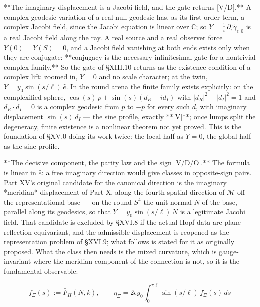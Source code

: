 **The imaginary displacement is a Jacobi field, and the gate returns [V/D].** A complex geodesic variation of a real null geodesic has, as its first-order term, a complex Jacobi field, since the Jacobi equation is linear over $\mathbb C$; so $Y = \tfrac1i\,\partial_\epsilon\widetilde\gamma_\epsilon|_0$ is a real Jacobi field along the ray. A real source and a real observer force $Y(0) = Y(S) = 0$, and a Jacobi field vanishing at both ends exists only when they are conjugate: **conjugacy is the necessary infinitesimal gate for a nontrivial complex family.** So the gate of §XIII.10 returns as the existence condition of a complex lift: zoomed in, $Y = 0$ and no scale character; at the twin, $Y = y_0\sin(s/\ell)\,\hat e$. In the round arena the finite family exists explicitly: on the complexified sphere, $\cos(s)\,p+\sin(s)(d_R+id_I)$ with $|d_R|^2-|d_I|^2 = 1$ and $d_R\cdot d_I = 0$ is a complex geodesic from $p$ to $-p$ for every such $d$, with imaginary displacement $\sin(s)\,d_I$ — the sine profile, exactly **[V]**; once lumps split the degeneracy, finite existence is a nonlinear theorem not yet proved. This is the foundation of §XV.0 doing its work twice: the local half as $Y = 0$, the global half as the sine profile.

**The decisive component, the parity law and the sign [V/D/O].** The formula is linear in $\hat e$: a free imaginary direction would give classes in opposite-sign pairs. Part XV's original candidate for the canonical direction is the imaginary *meridian* displacement of Part X, along the fourth spatial direction of $\mathcal M$ off the representational base — on the round $S^4$ the unit normal $N$ of the base, parallel along its geodesics, so that $Y = y_0\sin(s/\ell)\,N$ is a legitimate Jacobi field. That candidate is excluded by §XVI.8 if the actual Hopf data are plane-reflection equivariant, and the admissible displacement is reopened as the representation problem of §XVI.9; what follows is stated for it as originally proposed. What the class then needs is the mixed curvature, which is gauge-invariant where the meridian component of the connection is not, so it is the fundamental observable:

$$f_\Xi(s) := \bar F_H(N,k),\qquad \eta_\Xi = 2\epsilon y_0\int_0^{\pi\ell}\sin(s/\ell)\,f_\Xi(s)\,ds$$

